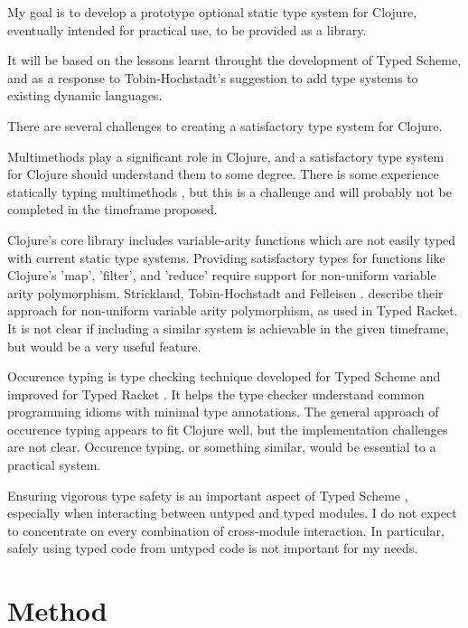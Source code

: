 \documentclass[12pt, a4paper]{article}
\begin{document}
My goal is to develop a prototype optional static type system for Clojure, 
eventually intended for practical use, to be provided as a library.

It will be based on the lessons learnt throught the development
of Typed Scheme, and as a response to Tobin-Hochstadt's \cite{TypedScheme:2010}
suggestion to add type systems to existing dynamic languages.

There are several challenges to creating a satisfactory type system for Clojure.

Multimethods play a significant role in Clojure, and a satisfactory
type system for Clojure should understand them to some degree.
There is some experience statically typing multimethods
\cite{Millstein02modularstatically}
, but this is a challenge and will probably not be completed in the
timeframe proposed.

Clojure's core library includes variable-arity functions which
are not easily typed with current static type systems. 
Providing satisfactory types for functions 
like Clojure's 'map', 'filter', and 'reduce' require
support for non-uniform variable arity polymorphism. 
Strickland, Tobin-Hochstadt and Felleisen \cite{Strickland:2009:PVP:1532974.1532978}.
describe their approach for non-uniform variable arity polymorphism, as used
in Typed Racket. It is not clear if including a similar system is 
achievable in the given timeframe, but would be a very useful feature. 

Occurence typing is type checking technique developed for Typed Scheme 
\cite{Tobin-Hochstadt:2008:DIT:1328897.1328486}
and improved for Typed Racket
\cite{Tobin-Hochstadt:2010:LTU:1932681.1863561}.
It helps the type checker understand common programming idioms 
with minimal type annotations.
The general approach of occurence typing appears to fit Clojure well,
but the implementation challenges are not clear. Occurence typing,
or something similar, would be essential to a practical system.

Ensuring vigorous type safety is an important aspect of Typed Scheme 
\cite{TypedScheme:2010} ,
especially when interacting between untyped and typed modules.
I do not expect to concentrate on every combination of cross-module
interaction. In particular, safely using typed code from untyped code
is not important for my needs.

\section*{Method}
\end{document}
